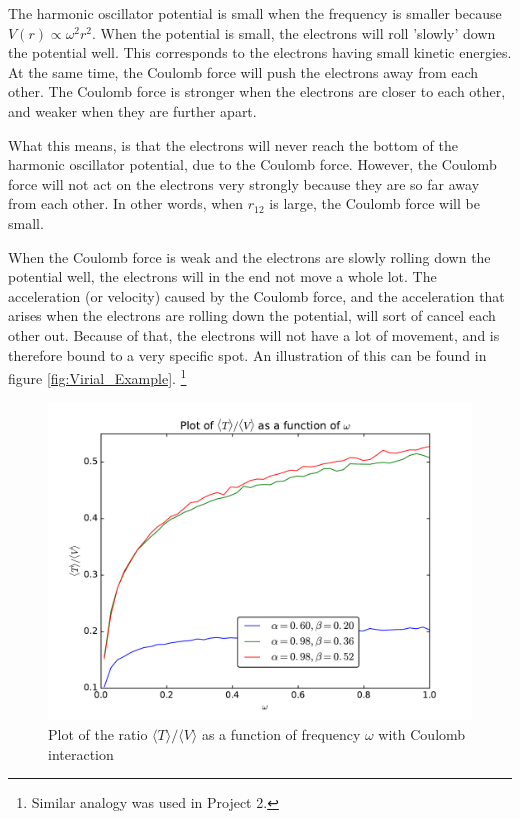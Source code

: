 \documentclass[12pt]{article}
\begin{document}
The harmonic oscillator potential is small when the frequency is smaller because $V(r) \propto \omega^2r^2$. When the potential is small, the electrons will roll 'slowly' down the potential well. This corresponds to the electrons having small kinetic energies. At the same time, the Coulomb force will push the electrons away from each other. The Coulomb force is stronger when the electrons are closer to each other, and weaker when they are further apart.

What this means, is that the electrons will never reach the bottom of the harmonic oscillator potential, due to the Coulomb force. However, the Coulomb force will not act on the electrons very strongly because they are so far away from each other. In other words, when $r_{12}$ is large, the Coulomb force will be small.

When the Coulomb force is weak and the electrons are slowly rolling down the potential well, the electrons will in the end not move a whole lot. The acceleration (or velocity) caused by the Coulomb force, and the acceleration that arises when the electrons are rolling down the potential, will sort of cancel each other out. Because of that, the electrons will not have a lot of movement, and is therefore bound to a very specific spot. An illustration of this can be found in figure \ref{fig:Virial_Example}. \footnote{Similar analogy was used in Project 2.}

\begin{figure}[h]
\centering
\includegraphics[width=\linewidth]{Plots/Virial_Plot.pdf}
\caption{Plot of the ratio $\langle T \rangle / \langle V \rangle$ as a function of frequency $\omega$ with Coulomb interaction}
\label{fig:Virial_Plot}
\end{figure}
\end{document}

